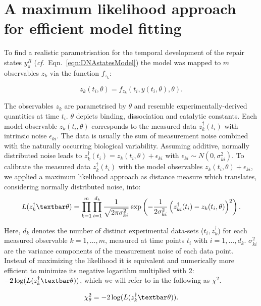 

\section{A maximum likelihood approach for efficient model fitting}
\label{sec:maximumLL}
To find a realistic parametrisation for the temporal development of the repair states $y_\pi^R$ (\textit{cf.}\ Eqn.\ \ref{eqn:DNAstatesModel}) the model was mapped to $m$ observables $z_k$ via the function $f_{z_k}$:

  \begin{equation}
  	z_k(t_i,\theta) = f_{z_k}(t_i,y(t_i,\theta),\theta).
  	\label{eqn:observable}
  \end{equation} 

The observables $z_k$ are parametrised by $\theta$ and resemble experimentally-derived quantities at time $t_i$. $\theta$ depicts binding, dissociation and catalytic constants. Each model observable $z_k(t_i,\theta)$ corresponds to the measured data $z_k^\dag(t_i)$ with intrinsic noise $\epsilon_{ki}$. The data is usually the sum of measurement noise combined with the naturally occurring biological variability. Assuming additive, normally distributed noise leads to $z_k^\dag(t_i) = z_k(t_i,\theta) + \epsilon_{ki}$ with $\epsilon_{ki} \sim N(0,\sigma_{ki}^2)$. To calibrate the measured data $z_k^\dag(t_i)$ with the model observables $z_k(t_i,\theta)+\epsilon_{ki}$, we applied a maximum likelihood approach as distance measure which translates, considering normally distributed noise, into:
\begin{equation}
\label{eqn:likelihood}
L(z_k^\dag \textbar \theta) = \prod_{k=1}^m \prod_{i=1}^{d_k} \frac{1}{\sqrt{2\pi \sigma_{ki}^2}}\exp \left( -\frac{1}{2\sigma_{ki}^2}\left(z_{ki}^\dag(t_i) - z_k(t_i,\theta)\right)^2\right).
\end{equation}
  
Here, $d_k$ denotes the number of distinct experimental data-sets ($t_i,z_k^\dag$) for each measured observable $k = 1,\ldots,m$, measured at time points $t_i$ with $i = 1,\ldots,d_k$. $\sigma_{ki}^2$ are the variance components of the measurement noise of each data point. Instead of maximizing the likelihood it is equivalent and numerically more efficient to minimize its negative logarithm multiplied with 2: $-2\log(L(z_k^\dag\textbar\theta))$, which we will refer to in the following as $\chi^{2}$.  

\begin{equation}\label{eqn:chiSquare}
\chi_\theta^2 = -2\log(L(z_k^\dag\textbar\theta)).
\end{equation}

